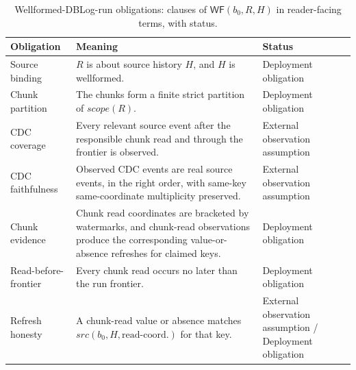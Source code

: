 \documentclass[letterpaper,10pt,twocolumn]{article}
\newcommand{\Src}{\mathit{src}}
\newcommand{\Scope}{\mathit{scope}}
\newcommand{\WF}{\mathsf{WF}}
\begin{document}
\begin{table}[t]
\caption{Wellformed-DBLog-run obligations: clauses of
$\WF(b_0,R,H)$ in reader-facing terms, with status.}
\label{tab:wellformed-obligations}
\centering\small
\begin{tabularx}{\textwidth}{@{}p{1.45in}Yp{1.8in}@{}}
\toprule
\textbf{Obligation} & \textbf{Meaning} & \textbf{Status}\\
\midrule
Source binding &
  $R$ is about source history $H$, and $H$ is wellformed. &
  Deployment obligation\\
Chunk partition &
  The chunks form a finite strict partition of $\Scope(R)$. &
  Deployment obligation\\
CDC coverage &
  Every relevant source event after the responsible chunk read and
  through the frontier is observed. &
  External observation assumption\\
CDC faithfulness &
  Observed CDC events are real source events, in the right order, with
  same-key same-coordinate multiplicity preserved. &
  External observation assumption\\
Chunk evidence &
  Chunk read coordinates are bracketed by watermarks, and chunk-read
  observations produce the corresponding value-or-absence refreshes for
  claimed keys. &
  Deployment obligation\\
Read-before-frontier &
  Every chunk read occurs no later than the run frontier. &
  Deployment obligation\\
Refresh honesty &
  A chunk-read value or absence matches
  $\Src(b_0,H,\text{read-coord.})$ for that key. &
  External observation assumption / Deployment obligation\\
\bottomrule
\end{tabularx}
\end{table}
\end{document}
